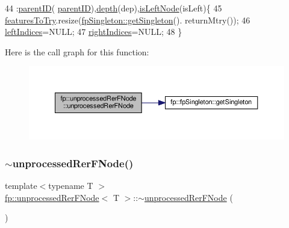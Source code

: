 \begin{DoxyCode}
44                                                                        :\hyperlink{classfp_1_1unprocessedRerFNode_ab87cfcf5df700dbc7ec02c87057b27aa}{parentID}(
      \hyperlink{classfp_1_1unprocessedRerFNode_ab87cfcf5df700dbc7ec02c87057b27aa}{parentID}),\hyperlink{classfp_1_1unprocessedRerFNode_ad54ee9ea4003179b8304afb4f20d3a84}{depth}(dep),\hyperlink{classfp_1_1unprocessedRerFNode_a75fe4b426a6a1cc8bb1de50380dcec94}{isLeftNode}(isLeft)\{
45                     \hyperlink{classfp_1_1unprocessedRerFNode_aa2028578f341c8f41cf000eb40d228f2}{featuresToTry}.resize(\hyperlink{classfp_1_1fpSingleton_a8bdae77b68521003e3fc630edec2e240}{fpSingleton::getSingleton}().
      returnMtry());
46                     \hyperlink{classfp_1_1unprocessedRerFNode_ae402805c487d29fa6d0b8fb6f873a4d3}{leftIndices}=NULL;
47                     \hyperlink{classfp_1_1unprocessedRerFNode_a4cc97ffcfe51937766fed926bbc4892a}{rightIndices}=NULL;
48                 \}
\end{DoxyCode}
Here is the call graph for this function\+:
\nopagebreak
\begin{figure}[H]
\begin{center}
\leavevmode
\includegraphics[width=350pt]{classfp_1_1unprocessedRerFNode_ab20dcd6c9729051144ac3013c7c8fd5d_cgraph}
\end{center}
\end{figure}
\mbox{\label{classfp_1_1unprocessedRerFNode_a3316afcf52743fc7ade9ba8e0cdde2e2}} 
\subsubsection{\texorpdfstring{$\sim$unprocessed\+Rer\+F\+Node()}{~unprocessedRerFNode()}}
{\footnotesize\ttfamily template$<$typename T $>$ \\
\hyperlink{classfp_1_1unprocessedRerFNode}{fp\+::unprocessed\+Rer\+F\+Node}$<$ T $>$\+::$\sim$\hyperlink{classfp_1_1unprocessedRerFNode}{unprocessed\+Rer\+F\+Node} (\begin{DoxyParamCaption}{ }\end{DoxyParamCaption})\hspace{0.3cm}{\ttfamily [inline]}}



